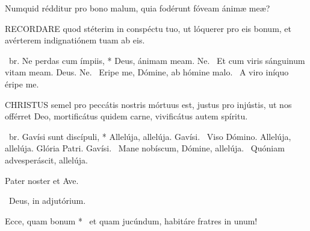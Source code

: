 


 Numquid rédditur pro bono malum, quia fodérunt fóveam ánimæ meæ?


\lettrine[lines=2]{R}{ECORDARE} quod stéterim in conspéctu tuo, ut lóquerer pro eis bonum, et avérterem indignatiónem tuam ab eis.

\R\ br. Ne perdas cum ímpiis, * Deus, ánimam meam. Ne. \V\ Et cum viris sánguinum vitam meam. Deus. Ne. \V\ Eripe me, Dómine, ab hómine malo. \R\ A viro iníquo éripe me.




\lettrine[lines=2]{C}{HRISTUS} semel pro peccátis nostris mórtuus est, justus pro injústis, ut nos offérret Deo, mortificátus quidem carne, vivificátus autem spíritu.

\R\ br. Gavísi sunt discípuli, * Allelúja, allelúja. Gavísi. \V\ Viso Dómino. Allelúja, allelúja. Glória Patri. Gavísi. \V\ Mane nobíscum, Dómine, allelúja. \R\ Quóniam advesperáscit, allelúja.


\sectionornament



Pater noster et Ave.

\V\ Deus, in adjutórium.


 Ecce, quam bonum * \textdagger\ et quam jucúndum, habitáre fratres in unum! \textdaggerdbl


